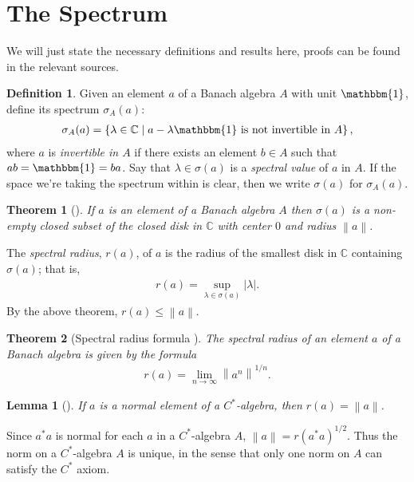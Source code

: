 \documentclass[11pt,a4paper]{report}
\theoremstyle{plain}
\newtheorem*{thm*}{Theorem}
\newtheorem{lemma}{Lemma}
\theoremstyle{definition}
\newtheorem{defn}{Definition}
\newcommand{\1}{\mathbbm{1}}
\newcommand{\C}{\mathbb{C}}
\newcommand{\spec}[1]{\sigma(#1)}
\begin{document}
\section{The Spectrum}\label{section:spectrum}
We will just state the necessary definitions and results here, proofs can be 
found in the relevant sources.

\begin{defn}
	Given an element $a$ of a Banach algebra $A$ with unit $\1$, define its 
	spectrum $\sigma_A(a)$:
	\begin{align*}
		\sigma_A(a)=\left\{\lambda\in \C \mid a-\lambda\1 
								\mbox{ is not invertible in }A\right\},
	\end{align*}
	where $a$ is \emph{invertible in $A$} if there exists an element $b\in A$ such 
	that $ab=\1=ba$. Say that $\lambda\in\spec a$ is a \emph{spectral value} of $a$ 
	in $A$. If the space we're taking the spectrum within is clear, then we 
	write $\spec{a}$ for $\sigma_A(a)$. 
\end{defn}

\begin{thm*}[{\cite[3.2.3]{kadison83}}]
	If $a$ is an element of a Banach algebra $A$ then $\spec a$ is a non-empty 
	closed subset of the closed disk in $\C$ with center $0$ and radius 
	$\left\|a\right\|$.
\end{thm*}

The \emph{spectral radius}, $r(a)$, of $a$ is the radius of the smallest disk in 
$\C$ containing $\spec a$; that is, 
\begin{align*}
	r(a)=\sup_{\lambda\in\spec a}{|\lambda|}.
\end{align*}
By the above theorem, $r(a)\leq\left\|a\right\|$. 

\begin{thm*}[Spectral radius formula {\cite[3.3.3]{kadison83}}]
	The spectral radius of an element $a$ of a Banach algebra is given by the formula
	\begin{align*}
		r(a)= \lim_{n\to\infty} \left\|a^n\right\|^{1/n}.
	\end{align*}
\end{thm*}

\begin{lemma}[{\cite[4.1.1(i)]{kadison83}}]\label{lemma:411}
	If $a$ is a normal element of a $C^\ast$-algebra, then $r(a)=\left\|a\right\|$.
\end{lemma}

Since $a^\ast a$ is normal for each $a$ in a $C^\ast$-algebra $A$, 
$\left\|a\right\| = r(a^\ast a)^{1/2}$. Thus the norm on a $C^\ast$-algebra $A$ 
is unique, in the sense that only one norm on $A$ can satisfy the $C^\ast$ 
axiom.~\cite[II.1.6.5]{blackadar06} 
\end{document}
